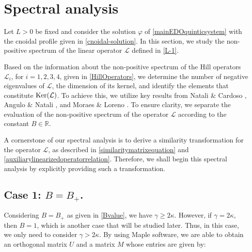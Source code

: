 \documentclass[10pt,reqno,a4paper]{amsart} %
\theoremstyle{definition} %
\numberwithin{equation}{section}
\numberwithin{figure}{section}
\begin{document}
\vspace{0.5cm}
\section{Spectral analysis}\label{SectionSpectralAnalysis} 

Let $L>0$ be fixed and consider  the solution $\varphi$ of \eqref{mainEDOquinticsystem} with the cnoidal profile given in \eqref{cnoidal-solution}. In this section, we study  the non-positive spectrum of the linear operator $\mathcal{L}$ defined in \eqref{L-1}. 

Based on the information about the non-positive spectrum of the Hill operators $\mathcal{L}_i$, for $i=1,2,3,4$, given in \eqref{HillOperators}, we determine the number of negative eigenvalues of $\mathcal{L}$, the dimension of its kernel, and identify the elements that constitute ${\rm Ker}(\mathcal{L})$. To achieve this, we utilize key results from Natali \& Cardoso \cite{NataliCardoso2013}, Angulo \& Natali \cite{AnguloNatali2009}, and Moraes \& Loreno \cite{BittencourtLoreno2022}. To ensure clarity, we separate the evaluation of the non-positive spectrum of the operator $\mathcal{L}$ according to the constant $B \in \mathbb{R}$.

A cornerstone of our spectral analysis is to derive a similarity transformation for the operator $\mathcal{L}$, as described in \eqref{similaritymatrixequation} and \eqref{auxiliarylinearizedoperatorrelation}. Therefore, we shall begin this spectral analysis by explicitly providing such a transformation.

\subsection*{Case 1: $B = B_+$.}\label{Spectral analysis- Case i)}

Considering $B=B_+$ as given in \eqref{Bvalue}, we have $\gamma \geq 2\kappa$. However, if $\gamma = 2\kappa$, then $B = 1$, which is another case that will be studied later. Thus, in this case, we only need to consider $\gamma > 2\kappa$. By using Maple software, we are able to obtain an orthogonal matrix $U$ and a matrix $M$ whose entries are given by:
\end{document}
